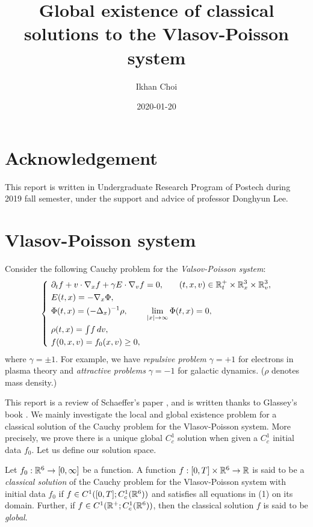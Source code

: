 \documentclass[11pt]{amsart}
\title{Global existence of classical solutions to the Vlasov-Poisson system}
\author{Ikhan Choi}
\date{2020-01-20}
\newcommand\tint{{\textstyle\int}}
\begin{document}
\maketitle
\tableofcontents

\section*{Acknowledgement}
This report is written in Undergraduate Research Program of Postech during 2019 fall semester, under the support and advice of professor Donghyun Lee.

\section{Vlasov-Poisson system}
Consider the following Cauchy problem for the \emph{Valsov-Poisson system}:
\begin{align}
\left\{\ \begin{alignedat}{2}
&\partial_tf+v\cdot\del_xf+\gamma E\cdot\del_vf=0,&&\qquad(t,x,v)\in\R_t^+\times\R_x^3\times\R_v^3,\\
&E(t,x)=-\del_x\Phi,\\
&\Phi(t,x)=(-\Delta_x)^{-1}\rho,&&\hspace{-2em}\lim_{|x|\to\infty}\Phi(t,x)=0,\\
&\rho(t,x)=\tint f\,dv,\\
&f(0,x,v)=f_0(x,v)\ge0,
\end{alignedat}\right.
\end{align}
where $\gamma=\pm1$.
For example, we have \emph{repulsive problem} $\gamma=+1$ for electrons in plasma theory and \emph{attractive problems} $\gamma=-1$ for galactic dynamics.
($\rho$ denotes mass density.)

This report is a review of Schaeffer's paper \cite{schaeffer1991global}, and is written thanks to Glassey's book \cite{glassey1996cauchy}.
We mainly investigate the local and global existence problem for a classical solution of the Cauchy problem for the Vlasov-Poisson system.
More precisely, we prove there is a unique global $C_c^1$ solution when given a $C_c^1$ initial data $f_0$.
Let us define our solution space.

\begin{defn*}
Let $f_0:\mathbb{R}^6\to[0,\infty]$ be a function.
A function $f:[0,T]\times\mathbb{R}^6\to\mathbb{R}$ is said to be a \emph{classical solution} of the Cauchy problem for the Vlasov-Poisson system with initial data $f_0$ if $f\in C^1([0,T];C_c^1(\mathbb{R}^6))$ and satisfies all equations in (1) on its domain.
Further, if $f\in C^1(\mathbb{R}^+;C_c^1(\mathbb{R}^6))$, then the classical solution $f$ is said to be \emph{global}.
\end{defn*}
\end{document}
